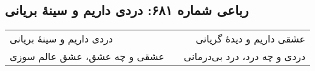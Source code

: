 \begin{center}
\section*{رباعی شماره ۶۸۱: دردی داریم و سینهٔ بریانی}
\label{sec:sh681}
\begin{longtable}{l p{0.5cm} r}
دردی داریم و سینهٔ بریانی
&&
عشقی داریم و دیدهٔ گریانی
\\
عشقی و چه عشق، عشق عالم سوزی
&&
دردی و چه درد، درد بی‌درمانی
\\
\end{longtable}
\end{center}
